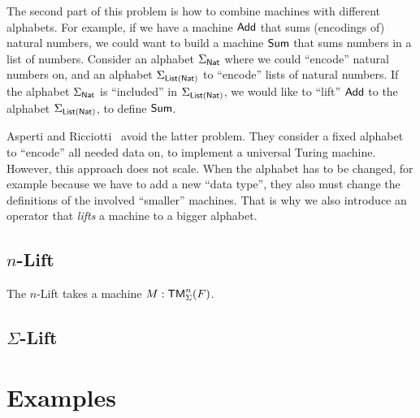 The second part of this problem is how to combine machines with different alphabets.  For example, if we have a machine $\textsf{Add}$ that sums
(encodings of) natural numbers, we could want to build a machine $\textsf{Sum}$ that sums numbers in a list of numbers.  Consider an alphabet
$\Sigma_{\textsf{Nat}}$ where we could ``encode'' natural numbers on, and an alphabet $\Sigma_{\textsf{List}(\textsf{Nat})}$ to ``encode'' lists of natural numbers.  If the
alphabet $\Sigma_{\textsf{Nat}}$ is ``included'' in $\Sigma_{\textsf{List}(\textsf{Nat})}$, we would like to ``lift'' $\textsf{Add}$ to the alphabet $\Sigma_{\textsf{List}(\textsf{Nat})}$, to
define $\textsf{Sum}$.

Asperti and Ricciotti~\cite{asperti2015} avoid the latter problem.  They consider a fixed alphabet to ``encode'' all needed data on, to implement a
universal Turing machine.  However, this approach does not scale.  When the alphabet has to be changed, for example because we have to add a new
``data type'', they also must change the definitions of the involved ``smaller'' machines.  That is why we also introduce an operator that
\emph{lifts} a machine to a bigger alphabet.

\subsection{$n$-Lift}
\label{sec:n-Lift}

The $n$-Lift takes a machine $M:\textsf{TM}_\Sigma^n(F)$.

\todo{}


\subsection{$\Sigma$-Lift}
\label{sec:sigma-Lift}


\todo{}




\section{Examples}
\label{sec:combining-examples}





